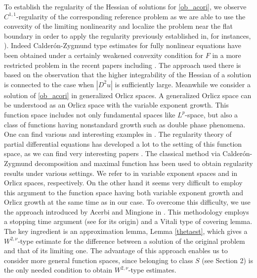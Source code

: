 \documentclass[11pt, reqno]{amsart}
\numberwithin{equation}{section}
\begin{document}
To establish the regularity of the Hessian of solutions for \eqref{ob_acori}, we
observe $C^{1,1}$-regularity of the corresponding reference problem
as we are able to use the convexity of the  limiting nonlinearity
and localize the problem near the flat boundary in order to apply
the regularity previously established in, for instances,
\cite{MR1351007, MR3780142}). Indeed Calder\'{o}n-Zygmund type
estimates for fully nonlinear equations have been obtained under a
certainly weakened convexity condition for $F$ in a more restricted
problem in the recent papers including \cite{MR3040680, MR3479199,
MR3539473, MR3957152, MR4258789}. The approach used there is based
on the observation that the higher integrability of the Hessian of a
solution is connected to the case when $|D^{2}u|$ is sufficiently
large. Meanwhile we consider a solution of \eqref{ob_acori} in
generalized Orlicz spaces. A generalized Orlicz space can be
understood as an Orlicz space with the variable exponent growth.
This function space includes not only fundamental spaces like
$L^{p}$-space, but also a class of functions having nonstandard
growth such as double phase phenomena. One can find various and
interesting examples in \cite{MR3931352}. The regularity theory of
partial differential equations has developed a lot to the setting of
this function space, as we can find very interesting papers
\cite{MR3165506, MR3418078, MR3811530, MR3592600, MR3360438,
MR3732884}. The classical method via Calder\'{o}n-Zygmund
decomposition and maximal function has been used to obtain
regularity results under various settings. We refer to
\cite{MR3900364} in variable exponent spaces and \cite{MR3957152} in
Orlicz spaces, respectively. On the other hand it seems very
difficult to employ this argument to the function space having both
variable exponent growth and Orlicz growth at the same time as in
our case. To overcome this difficulty, we use the approach
introduced by Acerbi and Mingione in \cite{MR2286632}. This
methodology employs a stopping time argument (see \cite{MR2352517}
for its origin) and a Vitali type of covering lemma. The key
ingredient is an approximation lemma, Lemma \ref{thetaest}, which
gives a $W^{2,\nu}$-type estimate for the difference between a
solution of the original problem and that of its limiting one. The
advantage of this approach enables us to consider more general
function spaces, since belonging to class $S$ (see Section 2) is the
only needed condition to obtain $W^{2,\nu}$-type estimates.
\end{document}
